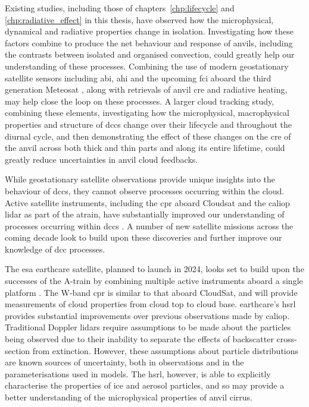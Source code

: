 Existing studies, including those of chapters~\ref{chp:lifecycle} and \ref{chp:radiative_effect} in this thesis, have observed how the microphysical, dynamical and radiative properties change in isolation.
Investigating how these factors combine to produce the net behaviour and response of anvils, including the contrasts between isolated and organised convection, could greatly help our understanding of these processes.
Combining the use of modern geostationary satellite sensors including \acrshort{abi}, \acrlong{ahi} and the upcoming \acrlong{fci} aboard the third generation Meteosat \citep{durand_flexible_2015}, along with retrievals of anvil \acrshort{cre} and radiative heating, may help close the loop on these processes.
A larger cloud tracking study, combining these elements, investigating how the microphysical, macrophysical properties and structure of \acrshort{dcc}s change over their lifecycle and throughout the diurnal cycle, and then demonstrating the effect of these changes on the \acrshort{cre} of the anvil across both thick and thin parts and along its entire lifetime, could greatly reduce uncertainties in anvil cloud feedbacks.

While geostationary satellite observations provide unique insights into the behaviour of \acrshort{dcc}s, they cannot observe processes occurring within the cloud.
Active satellite instruments, including the \acrshort{cpr} aboard Cloudsat and the \acrlong{caliop} lidar as part of the \acrfull{atrain}, have substantially improved our understanding of processes occurring within \acrshort{dcc}s \citep{stephens_cloudsat_2018}.
A number of new satellite missions across the coming decade look to build upon these discoveries and further improve our knowledge of \acrshort{dcc} processes.

The \acrshort{esa} \acrfull{earthcare} satellite, planned to launch in 2024, looks set to build upon the successes of the A-train by combining multiple active instruments aboard a single platform \citep{wehr_earthcare_2023}.
The W-band \acrshort{cpr} is similar to that aboard CloudSat, and will provide measurements of cloud properties from cloud top to cloud base.
\acrshort{earthcare}'s \acrfull{hsrl} provides substantial improvements over previous observations made by \acrshort{caliop}.
Traditional Doppler lidars require assumptions to be made about the particles being observed due to their inability to separate the effects of backscatter cross-section from extinction.
However, these assumptions about particle distributions are known sources of uncertainty, both in observations and in the parameterisations used in models.
The \acrshort{hsrl}, however, is able to explicitly characterise the properties of ice and aerosol particles, and so may provide a better understanding of the microphysical properties of anvil cirrus.

